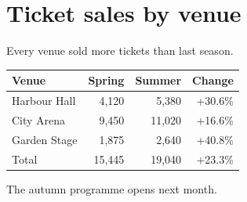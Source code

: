 \documentclass{article}
\begin{document}
\section*{Ticket sales by venue}
Every venue sold more tickets than last season.

\begin{center}
\begin{tabular}{|l|r|r|r|}
\hline
Venue & Spring & Summer & Change \\
\hline
Harbour Hall & 4,120 & 5,380 & +30.6\% \\
\hline
City Arena & 9,450 & 11,020 & +16.6\% \\
\hline
Garden Stage & 1,875 & 2,640 & +40.8\% \\
\hline
Total & 15,445 & 19,040 & +23.3\% \\
\hline
\end{tabular}
\end{center}

The autumn programme opens next month.
\end{document}
